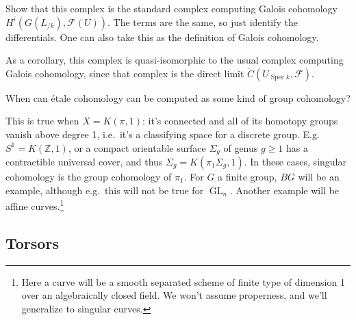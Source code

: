 \begin{example}[?]
\begin{exercise}[?]

Show that this complex is the standard complex computing Galois
cohomology \(H^i( G(L_{/k}), \mathcal{F}(U) )\). The terms are the same,
so just identify the differentials. One can also take this as the
definition of Galois cohomology.

\end{exercise}

As a corollary, this complex is quasi-isomorphic to the usual complex
computing Galois cohomology, since that complex is the direct limit
\({\check{C}}(U_{\operatorname{Spec}k}, \mathcal{F})\).

\end{example}

\begin{question}

When can étale cohomology can be computed as some kind of group
cohomology?

\end{question}

\begin{answer}

This is true when \(X = K(\pi, 1)\): it's connected and all of its
homotopy groups vanish above degree 1, i.e.~it's a classifying space for
a discrete group. E.g. \(S^1 = K({\mathbb{Z}}, 1)\), or a compact
orientable surface \(\Sigma_g\) of genus \(g\geq 1\) has a contractible
universal cover, and thus \(\Sigma_g = K(\pi_1 \Sigma_g, 1)\). In these
cases, singular cohomology is the group cohomology of \(\pi_1\). For
\(G\) a finite group, \(BG\) will be an example, although e.g.~this will
not be true for \(\operatorname{GL}_n\). Another example will be affine
curves.\footnote{Here a curve will be a smooth separated scheme of
  finite type of dimension 1 over an algebraically closed field. We
  won't assume properness, and we'll generalize to singular curves.}

\end{answer}

\hypertarget{torsors}{%
\subsection{Torsors}\label{torsors}}

